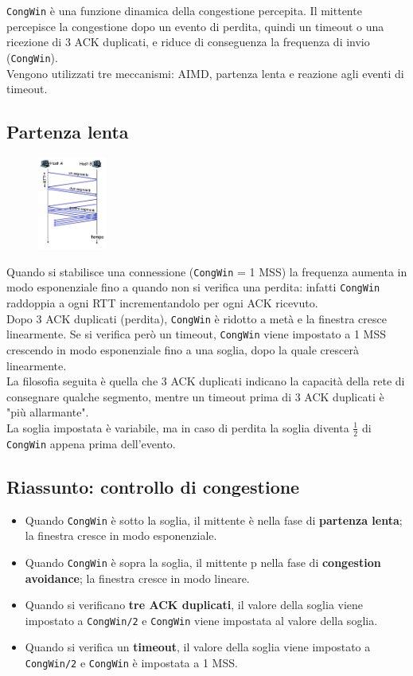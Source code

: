 \documentclass{report}
\begin{document}
	\verb|CongWin| è una funzione dinamica della congestione percepita. Il mittente percepisce la congestione dopo un evento di perdita, quindi un timeout o una ricezione di 3 ACK duplicati, e riduce di conseguenza la frequenza di invio (\verb|CongWin|).
	\medskip\\Vengono utilizzati tre meccanismi: AIMD, partenza lenta e reazione agli eventi di timeout.
	\subsection{Partenza lenta}
	\begin{figure}
		\centering
		\includegraphics[width=0.2\textwidth]{partenza-lenta}
		\vspace{-30pt}
	\end{figure}
	Quando si stabilisce una connessione (\verb|CongWin| = 1 MSS) la frequenza aumenta in modo esponenziale fino a quando non si verifica una perdita: infatti \verb|CongWin| raddoppia a ogni RTT incrementandolo per ogni ACK ricevuto.
	\medskip\\Dopo 3 ACK duplicati (perdita), \verb|CongWin| è ridotto a metà e la finestra cresce linearmente. Se si verifica però un timeout, \verb|CongWin| viene impostato a 1 MSS crescendo in modo esponenziale fino a una soglia, dopo la quale crescerà linearmente.
	\medskip\\La filosofia seguita è quella che 3 ACK duplicati indicano la capacità della rete di consegnare qualche segmento, mentre un timeout prima di 3 ACK duplicati è "più allarmante".
	\medskip\\La soglia impostata è variabile, ma in caso di perdita la soglia diventa \(\frac{1}{2}\) di \verb|CongWin| appena prima dell'evento.
	\subsection{Riassunto: controllo di congestione}
	\begin{itemize}
		\item Quando \verb|CongWin| è sotto la soglia, il mittente è nella fase di \textbf{partenza lenta}; la finestra cresce in modo esponenziale.
		\item Quando \verb|CongWin| è sopra la soglia, il mittente p nella fase di \textbf{congestion avoidance}; la finestra cresce in modo lineare.
		\item Quando si verificano \textbf{tre ACK duplicati}, il valore della soglia viene impostato a \verb|CongWin/2| e \verb|CongWin| viene impostata al valore della soglia.
		\item Quando si verifica un \textbf{timeout}, il valore della soglia viene impostato a \verb|CongWin/2| e \verb|CongWin| è impostata a 1 MSS.
	\end{itemize}
\end{document}
